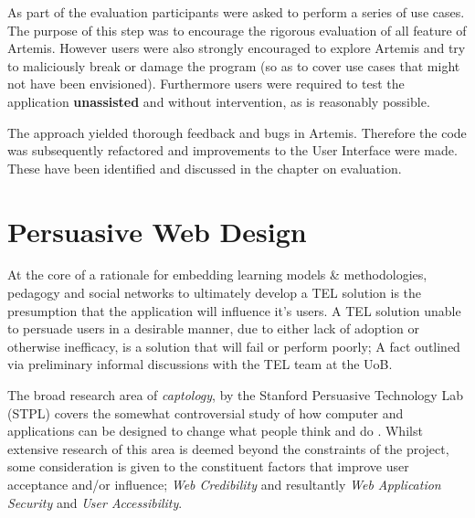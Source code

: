 \begin{itemize}
\begin{itemize}
        As part of the  evaluation participants were asked to perform a series of use cases. The purpose of this step was to encourage the rigorous evaluation of all feature of Artemis. However users were also strongly encouraged to explore Artemis and try to maliciously break or damage the program (so as to cover use cases that might not have been envisioned). Furthermore users were required to test the application \textbf{unassisted} and without intervention, as is reasonably possible.
        
        The approach yielded thorough feedback and bugs in Artemis. Therefore the code was subsequently refactored and improvements to the User Interface were made. These have been identified and discussed in the chapter on evaluation.
        
        
    \end{itemize}
    
\end{itemize}

 
\section{Persuasive Web Design}

At the core of a rationale for embedding  learning models \& methodologies, pedagogy and social networks to ultimately develop a TEL solution is the presumption that the application will influence it's users. A TEL solution unable to persuade users in a desirable manner, due to either lack of adoption or otherwise inefficacy, is a solution that will fail or perform poorly; A fact outlined via preliminary informal discussions with the TEL team at the UoB.

The broad research area of \textit{captology}, by the Stanford Persuasive Technology Lab (STPL) covers the somewhat controversial study of  how computer and applications can be designed to change what people think and do \cite{Fogg2002a,Fogg2002,Fogg2001,Fogg1999}. Whilst extensive research of this area is deemed beyond the constraints of the project, some consideration is given to the constituent factors that improve user acceptance and/or influence; \textit{Web Credibility} and resultantly \textit{Web Application Security} and \textit{User Accessibility}.


